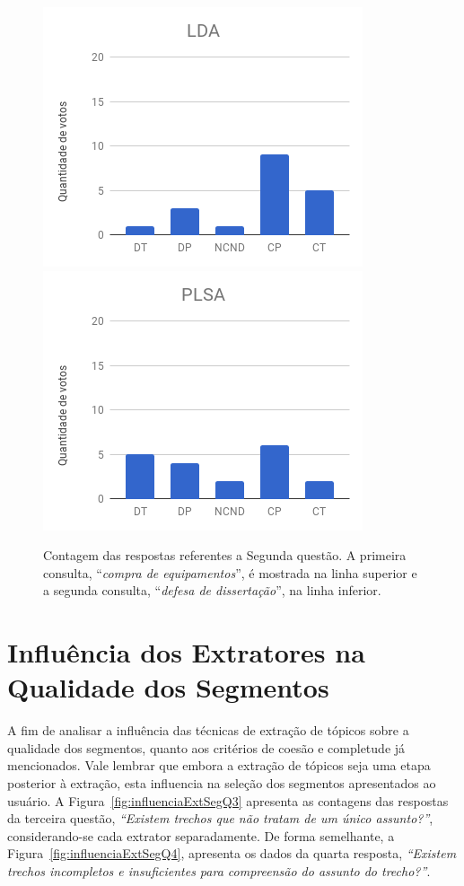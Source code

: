 \begin{figure}[!h]
		\includegraphics[width=.31\textwidth]{conteudo/capitulos/figs/figuras-experimento/C2-Q2-LDA.png}
		\includegraphics[width=.31\textwidth]{conteudo/capitulos/figs/figuras-experimento/C2-Q2-PLSA.png}

	\caption{Contagem das respostas referentes a Segunda questão. A primeira consulta, ``\textit{compra de equipamentos}'', é mostrada na linha superior e a segunda consulta, ``\textit{defesa de dissertação}'', na linha inferior.}
	\label{fig:c12-q2}
\end{figure}








\section{Influência dos Extratores na Qualidade dos Segmentos}

A fim de analisar a influência das técnicas de extração de tópicos sobre a qualidade dos segmentos, quanto aos critérios de coesão e completude já mencionados. Vale lembrar que embora a extração de tópicos seja uma etapa posterior à extração, esta influencia na seleção dos segmentos apresentados ao usuário. 
A Figura~\ref{fig:influenciaExtSegQ3} apresenta as contagens das respostas da terceira questão, \textit{``Existem trechos que não tratam de um único assunto?''}, considerando-se cada extrator separadamente. De forma semelhante, a Figura~\ref{fig:influenciaExtSegQ4}, apresenta os dados da quarta resposta, \textit{``Existem trechos incompletos e insuficientes para compreensão do assunto do trecho?''}.



